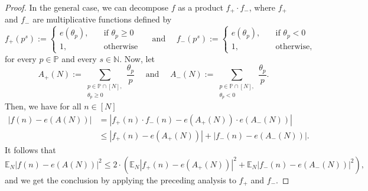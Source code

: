 \documentclass[11pt]{amsart}
\theoremstyle{definition}
\newcommand{\E}{{\mathbb E}}
\newcommand{\N}{{\mathbb N}}
\renewcommand{\P}{{\mathbb P}}
\begin{document}
\begin{proof}
	In the general case, we can decompose $f$ as a product $f_+\cdot f_-$, where $f_+$ and $f_-$ are multiplicative functions defined by
	$$ f_+(p^s) := \begin{cases}
                    e(\theta_p),\quad  & \text{if }\theta_p\geq0\\
	                1,\quad   &\text{otherwise}
	              \end{cases}
    \quad\text{ and }\quad
    f_-(p^s) := \begin{cases}
                    e(\theta_p),\quad  &\text{if }\theta_p<0\\
	                1, \quad  &\text{otherwise,}
	              \end{cases}
    $$
	for every $p\in\P$ and every $s\in\N$. Now, let
	$$
	A_+(N):=\sum_{\substack{p\in \P\cap [N],\\ \theta_p\geq0}}  \frac{\theta_p}{p}
	\quad\text{ and }\quad
	A_-(N):=\sum_{\substack{p\in \P\cap [N],\\ \theta_p<0}}  \frac{\theta_p}{p}.
	$$
	Then, we have for all $n\in[N]$
	\begin{align*}
	|f(n)-e(A(N))| &= |f_+(n)\cdot f_-(n)-e(A_+(N))\cdot e(A_-(N))| \\
	&\leq |f_+(n)-e(A_+(N))| + |f_-(n)-e(A_-(N))|.
	\end{align*}
	It follows   that
	$$
	\E_N |f(n)-e(A(N))|^2 \leq 2\cdot \left(\E_N |f_+(n)-e(A_+(N))|^2 +
	\E_N |f_-(n)-e(A_-(N))|^2\right),
	$$
	and we get the conclusion by applying the preceding analysis to $f_+$ and $f_-$.
\end{proof}	 	
\end{document}
